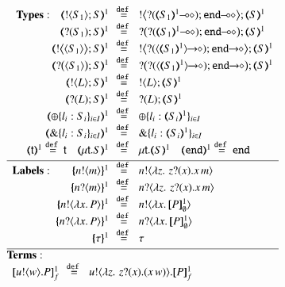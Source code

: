 \begin{figure}[t]
\[
\begin{array}{l}
\begin{array}{rcll}
\noindent{\bf Types:} \quad 
		\tmap{\btout{S_1} {S} }{1}	&\!\!\defeq\!\!&	\bbtout{\lhot{\btinp{\lhot{\tmap{S_1}{1}}}\tinact}} \tmap{S}{1}  \\
		\tmap{\btinp{S_1} S }{1}	&\!\!\defeq\!\!&	\bbtinp{\lhot{\btinp{\lhot{\tmap{S_1}{1}}}\tinact}} \tmap{S}{1} \\
		\tmap{\bbtout{\chtype{S_1}} {S} }{1}	&\!\!\defeq\!\!&	\bbtout{\shot{\btinp{\shot{\chtype{\tmap{S_1}{1}}}}\tinact}} \tmap{S}{1}  \\
		\tmap{\bbtinp{\chtype{S_1}} {S} }{1}	&\!\!\defeq\!\!&	\bbtinp{\shot{\btinp{\shot{\chtype{\tmap{S_1}{1}}}}\tinact}} \tmap{S}{1} \\
		\tmap{\btout{L} S}{1} &\!\!\defeq\!\!& \btout{L} \tmap{S}{1}\\
		\tmap{\btinp{L} S}{1} &\!\!\defeq\!\!& \btinp{L} \tmap{S}{1}\\
		\tmap{\btsel{l_i: S_i}_{i \in I}}{1} &\!\!\defeq\!\!& \btsel{l_i: \tmap{S_i}{1}}_{i \in I}\\
		\tmap{\btbra{l_i: S_i}_{i \in I}}{1} &\!\!\defeq\!\!& \btbra{l_i: \tmap{S_i}{1}}_{i \in I}\\
\tmap{\vart{t}}{1} \defeq \vart{t} \quad 
		\tmap{\trec{t}{S}}{1}  &\!\!\defeq\!\!&
\trec{t}{\tmap{S}{1}}\quad 
\tmap{\tinact}{1}  \defeq  \tinact\\[1mm]
\hline
\noindent{\bf Labels:} \quad \quad 
	\mapa{\bactout{n}{m}}^{1} &\!\!\defeq\!\!&   \bactout{n}{\abs{z}{\,\binp{z}{x} \appl{x}{m}} } \\
	\mapa{\bactinp{n}{m}}^{1} &\!\!\defeq\!\!&   \bactinp{n}{\abs{z}{\,\binp{z}{x} \appl{x}{m}} } \\
		\mapa{\bactout{n}{\abs{{x}}{P}}}^{1} &\!\!\defeq\!\!& \bactout{n}{\abs{{x}}{\pmapp{P}{1}{\es}}}\\
		\mapa{\bactinp{n}{\abs{{x}}{P}}}^{1} &\!\!\defeq\!\!& \bactinp{n}{\abs{{x}}{\pmapp{P}{1}{\es}}}\\
		\mapa{\tau}^{1} &\!\!\defeq\!\!& \tau
\\[1mm]
\hline
\end{array}
\\[1mm]
\noindent{\bf Terms:}\\
\begin{array}{rcll}
  \pmapp{\bout{u}{w} P}{1}{f}	&\!\!\defeq\!\!&	\bout{u}{ \abs{z}{\,\binp{z}{x} (\appl{x}{w})} } \pmapp{P}{1}{f} \\

\end{array}
\end{array}\]
\end{figure}
